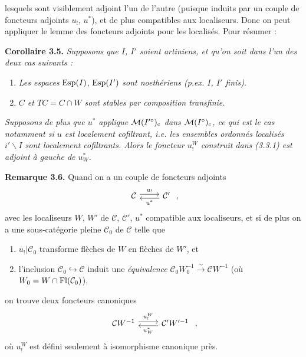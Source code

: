 \dgrchunkbegin

lesquels sont visiblement adjoint l'un de l'autre (puisque induits par un couple de foncteurs %
adjoints $u_!$, $u^*$), et de plus compatibles aux localiseurs. Donc on peut appliquer le lemme des foncteurs adjoints pour les localisés. Pour résumer :

\textbf{Corollaire 3.5.} \textit{Supposons que $I$, $I'$ soient artiniens, et qu'on soit dans l'un des deux cas suivants :}
\begin{enumerate}
\item[a)] \textit{Les espaces} $\operatorname{Esp}(I)$, $\operatorname{Esp}(I')$ \textit{sont noethériens (p.ex. $I$, $I'$ finis).}
\item[b)] \textit{$C$ et $TC = C\cap W$ sont stables par composition transfinie.}
\end{enumerate}
\textit{Supposons de plus que $u^*$ applique $\mathcal{M}(I'^\circ)_{\mathrm{c}}$ dans $\mathcal{M}(I^\circ)_{\mathrm{c}}$, ce qui est le cas notamment si $u$ est localement cofiltrant, i.e. les ensembles ordonnés localisés $i'\backslash I$ sont localement cofiltrants. Alors le foncteur $u_!^W$ construit dans (3.3.1) est adjoint à gauche de $u_W^*$.}

\textbf{Remarque 3.6.} Quand on a un couple de foncteurs adjoints
\[
\begin{tikzcd}
\mathcal{C} \arrow[r, shift left, "u_!"] & \mathcal{C}' \arrow[l, shift left, "u^*"]
\end{tikzcd}
\ ,
\]
avec les localiseurs $W$, $W'$ de $\mathcal{C}$, $\mathcal{C}'$, $u^*$ compatible aux localiseurs, et si de plus on a une sous-catégorie pleine $\mathcal{C}_0$ de $\mathcal{C}$ telle que
\begin{enumerate}
\item[a)] $u_!|\mathcal{C}_0$ transforme flèches de $W$ en flèches de $W'$, et
\item[b)] l'inclusion $\mathcal{C}_0 \hookrightarrow \mathcal{C}$ induit une \textit{équivalence} $\mathcal{C}_0W_0^{-1} \xrightarrow{\sim} \mathcal{C}W^{-1}$ (où $W_0 = W\cap\operatorname{Fl}(\mathcal{C}_0)$),
\end{enumerate}
on trouve deux foncteurs canoniques
\[
\begin{tikzcd}
\mathcal{C}W^{-1} \arrow[r, shift left, "u_!^W"] & \mathcal{C}'W'^{-1} \arrow[l, shift left, "u_W^*"]
\end{tikzcd}
\ ,
\]
où $u_!^W$ est défini seulement à isomorphisme canonique près.

